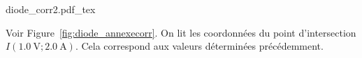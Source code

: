 \documentclass[a4paper, 10pt, garamond, oneside]{book}
\begin{document}
{\begin{enumerate}
\begin{minipage}[t]{.55\linewidth}
\begin{DispWithArrows*}
              \\\Ra 
            \end{DispWithArrows*}
      \end{minipage}
      \hfill
      \begin{minipage}[t]{.4\linewidth}
        ~
        \vspace{-30pt}
        \begin{center}
          {diode_corr2.pdf_tex}
        \end{center}
      \end{minipage}
     Voir Figure~\ref{fig:diode_annexecorr}. On lit les coordonnées du
          point d'intersection $I(\SI{1.0}{\volt};\SI{2.0}{\ampere})$. Cela
          correspond aux valeurs déterminées précédemment.
	\end{enumerate}
}

\newpage
\end{document}
